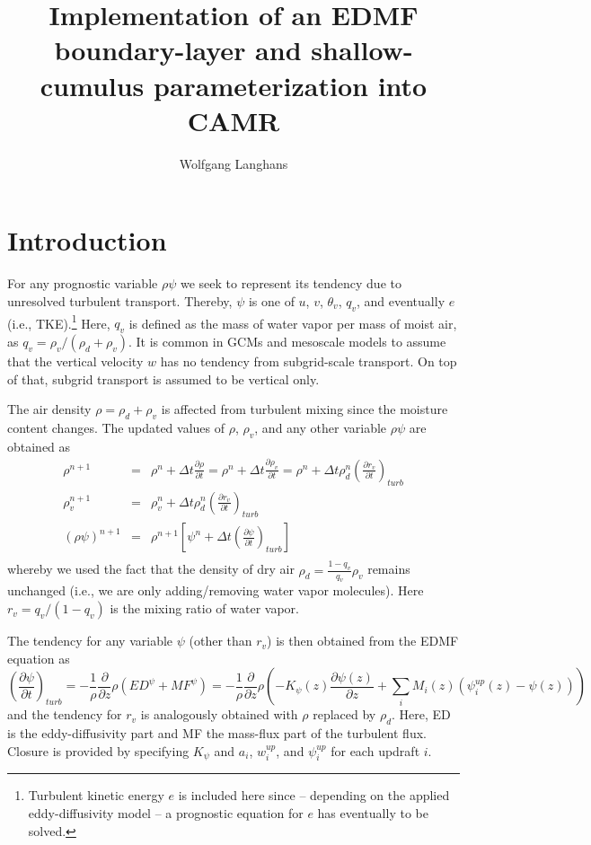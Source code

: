 \documentclass[dvipdfmx,a4paper,10pt]{article}
\title{Implementation of an EDMF boundary-layer and shallow-cumulus parameterization into CAMR}
\author{Wolfgang Langhans}
\begin{document}
\maketitle

\section{Introduction}\label{se:intro}

For any prognostic variable $\rho\psi$ we seek to represent its tendency due to unresolved turbulent transport. Thereby, $\psi$ is one of $u$, $v$, $\theta_v$, $q_v$, and eventually $e$ (i.e., TKE).\footnote{Turbulent kinetic energy $e$ is included here since -- depending on the applied eddy-diffusivity model -- a prognostic equation for $e$ has eventually to be solved.} Here, $q_v$ is defined as the mass of water vapor per mass of moist air, as $q_v=\rho_v/(\rho_d+\rho_v)$. It is common in GCMs and mesoscale models to assume that the vertical velocity $w$ has no tendency from subgrid-scale transport. On top of that, subgrid transport is assumed to be vertical only. 

The air density $\rho=\rho_d+\rho_v$ is affected from turbulent mixing since the moisture content changes. The updated values of $\rho$, $\rho_v$, and any other variable $\rho \psi$ are obtained as 
\begin{eqnarray}
\rho^{n+1}&=&\rho^n + \Delta t \frac{\partial \rho}{\partial t}=\rho^n + \Delta t \frac{\partial \rho_v}{\partial t}=\rho^n + \Delta t \rho_d^n\left(\frac{\partial r_v}{\partial t}\right)_{turb} \\
\rho_v^{n+1}&=&\rho_v^n + \Delta t \rho_d^n\left(\frac{\partial r_v}{\partial t}\right)_{turb}\\
 (\rho\psi)^{n+1} &=& \rho^{n+1}\left[\psi^n + \Delta t \left(\frac{\partial \psi}{\partial t}\right)_{turb}\right]\\
\end{eqnarray}
whereby we used the fact that the density of dry air $\rho_d=\frac{1-q_v}{q_v}\rho_v$ remains unchanged (i.e., we are only adding/removing water vapor molecules). Here $r_v=q_v/(1-q_v)$ is the mixing ratio of water vapor.  

The tendency for any variable $\psi$ (other than $r_v$) is then obtained from the EDMF equation as
\begin{equation}\label{eqn:tendency}
 \left(\frac{\partial \psi}{\partial t}\right)_{turb} =-\frac{1}{\rho}\frac{\partial }{\partial z} \rho \left( ED^{\psi} + MF^{\psi}\right) = -\frac{1}{\rho}\frac{\partial }{\partial z} \rho\left( -K_{\psi}(z)\frac{\partial \psi(z)}{\partial z} + \sum_i M_i(z) (\psi^{up}_i(z) - \psi(z) )\right)
\end{equation}
and the tendency for $r_v$ is analogously obtained with $\rho$ replaced by $\rho_d$. Here, ED is the eddy-diffusivity part and MF the mass-flux part of the turbulent flux. Closure is provided by specifying $K_{\psi}$ and $a_i$, $w^{up}_i$, and $\psi^{up}_i$ for each updraft $i$.
\end{document}

